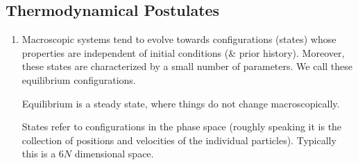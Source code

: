 \subsection{Thermodynamical Postulates}

\begin{enumerate}

\item Macroscopic systems tend to evolve towards configurations (states) whose properties are independent of initial conditions (\& prior history). Moreover, these states are characterized by a small number of parameters. We call these equilibrium configurations.

Equilibrium is a steady state, where things do not change macroscopically.

States refer to configurations in the phase space (roughly speaking it is the collection of positions and velocities of the individual particles). Typically this is a $6N$ dimensional space. 

\end{enumerate}